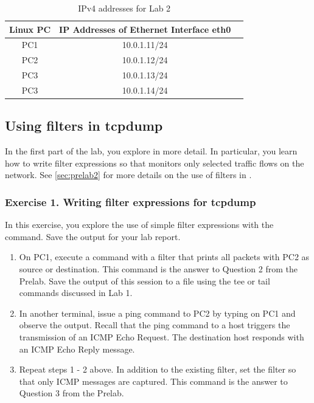 \begin{table}[h!t]
	\centering
	\begin{tabular}{| c | c | c |}	
		\hline
		\textbf{Linux PC} & \textbf{IP Addresses of Ethernet Interface eth0}  \\ \hline
		PC1 & 10.0.1.11/24 \\ 
		PC2 & 10.0.1.12/24 \\
		PC3 & 10.0.1.13/24 \\
		PC3 & 10.0.1.14/24 \\ \hline
		\end{tabular}
	\caption{IPv4 addresses for Lab 2}
	\label{tab:lab2-ip-addresses}
\end{table}

\newpage
\subsection{Using filters in tcpdump}

In the first part of the lab, you explore  in more detail. In particular, you learn how to write filter expressions so that  monitors only selected traffic flows on the network. See \ref{sec:prelab2} for more details on the use of filters in .

\subsubsection*{Exercise 1. Writing filter expressions for tcpdump}

In this exercise, you explore the use of simple filter expressions with the  command. Save the output for your lab report.

\begin{enumerate}
	\item On PC1, execute a  command with a filter that prints all packets with PC2 as source or destination. This command is the answer to Question 2 from the Prelab. Save the output of this  session to a file using the tee or tail commands discussed in Lab 1.\hspace*{\fill}
	\item In another terminal, issue a ping command to PC2 by typing  on PC1 and observe the output. Recall that the ping command to a host triggers the transmission of an ICMP Echo Request. The destination host responds with an ICMP Echo Reply message.
	\item Repeat steps 1 - 2 above. In addition to the existing filter, set the filter so that only ICMP messages are captured. This command is the answer to Question 3 from the Prelab.
\end{enumerate}

